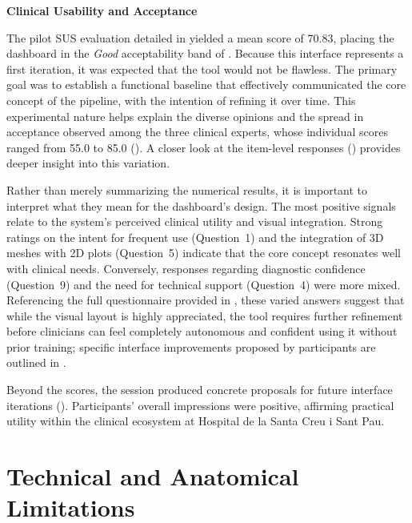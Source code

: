 \vspace{0.75em}
\noindent\textbf{Clinical Usability and Acceptance}\par
\vspace{0.4em}
\noindent
The pilot SUS evaluation detailed in  yielded a mean score of 70.83, placing the dashboard in the \emph{Good} acceptability band of . Because this interface represents a first iteration, it was expected that the tool would not be flawless. The primary goal was to establish a functional baseline that effectively communicated the core concept of the pipeline, with the intention of refining it over time. This experimental nature helps explain the diverse opinions and the spread in acceptance observed among the three clinical experts, whose individual scores ranged from 55.0 to 85.0 (). A closer look at the item-level responses () provides deeper insight into this variation.

Rather than merely summarizing the numerical results, it is important to interpret what they mean for the dashboard's design. The most positive signals relate to the system's perceived clinical utility and visual integration. Strong ratings on the intent for frequent use (Question~1) and the integration of 3D meshes with 2D plots (Question~5) indicate that the core concept resonates well with clinical needs. Conversely, responses regarding diagnostic confidence (Question~9) and the need for technical support (Question~4) were more mixed. Referencing the full questionnaire provided in , these varied answers suggest that while the visual layout is highly appreciated, the tool requires further refinement before clinicians can feel completely autonomous and confident using it without prior training; specific interface improvements proposed by participants are outlined in .

Beyond the scores, the session produced concrete proposals for future interface iterations (). Participants' overall impressions were positive, affirming practical utility within the clinical ecosystem at Hospital de la Santa Creu i Sant Pau.

\section{Technical and Anatomical Limitations}
\label{sec:discussion-limitations}

